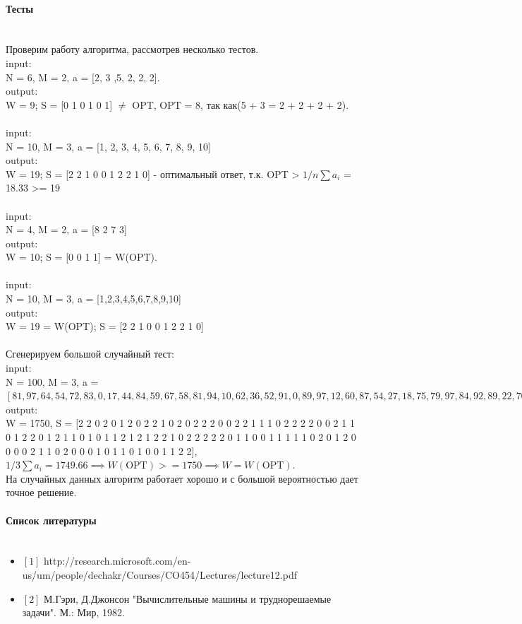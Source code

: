 \documentclass[10pt]{article}
\begin{document}
\paragraph{\Large{Тесты\\\\}}
Проверим работу алгоритма, рассмотрев несколько тестов. \\ 
input:\\
N = 6, M = 2, a = [2, 3 ,5, 2, 2, 2].\\
output:\\
W = 9; S = [0 1 0 1 0 1] $\neq$ OPT, OPT = 8, так как(5 + 3 = 2 + 2 + 2 + 2). \\ \\ 
input: \\
N = 10, M = 3, a = [1, 2, 3, 4, 5, 6, 7, 8, 9, 10] \\
output: \\
W = 19; S = [2 2 1 0 0 1 2 2 1 0] - оптимальный ответ, т.к. OPT > $1/n \sum a_i$ = 18.33 >= 19 \\ \\ 
input: \\
N = 4, M = 2, a = [8 2 7 3] \\
output:\\
W = 10; S = [0 0 1 1] = W(OPT). \\ \\
input: \\N = 10, M = 3, a = [1,2,3,4,5,6,7,8,9,10]\\
output: \\
W = 19 = W(OPT); S = [2 2 1 0 0 1 2 2 1 0]
\\\\
Сгенерируем большой случайный тест: \\
input: \\
N = 100, M = 3, a = $[81, 97, 64, 54, 72, 83, 0, 17, 44, 84, 59, 67, 58, 81, 94, 10, 62, 36, 52, 91, 0, 89, 97, 12, 60, 87, 54, 27, 18, 75, 79, 97, 84, 92, 89, 22, 70, 82, 12, 50, 23, 27, 73, 23, 56, 92, 61, 14, 90, 97, 23, 68, 57, 26, 87, 32, 40, 32, 13, 74, 64, 9, 35, 1, 21, 60, 55, 24, 75, 35, 47, 87, 1, 17, 5, 65, 68, 55, 8, 43, 70, 94, 42, 33, 40, 55, 86, 96, 26, 44, 13, 63, 94, 77, 98, 25, 19, 68, 15, 6]$
output: \\ 
W = 1750, S = [2 2 0 2 0 1 2 0 2 2 1 0 2 0 2 2 2 0 0 2 2 1 1 1 0 2 2 2 2 0 0 2 1 1 0 1 2 2 0 1 2 1 1 0 1 0 1 1 2 1 2 1 2 2 1 0 2 2 2 2 2 0 1 1 0 0 1 1 1 1 1 0 2 0 1 2 0 0 0 0 2 1 1 0 2 0 0 0 1 0 1 1 0 1 0 0 1 1 2 2], \\
$1/3 \sum a_i = 1749.66 \implies W(\text{OPT}) >= 1750 \implies W = W(\text{OPT}).$ \\ 
На случайных данных алгоритм работает хорошо и с большой вероятностью дает точное решение.


\paragraph{\Large{Список литературы\\\\}}
\begin{itemize}
 \item $[1]$ http://research.microsoft.com/en-us/um/people/dechakr/Courses/CO454/Lectures/lecture12.pdf
 \item $[2]$ М.Гэри, Д.Джонсон "Вычислительные машины и труднорешаемые задачи". М.: Мир, 1982.
\end{itemize}
\end{document}
